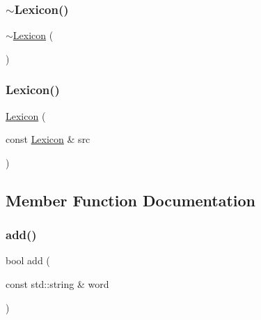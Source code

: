 \mbox{\label{classLexicon_a9d71fdc56ec42614e240463e6724969e}} 
\subsubsection{\texorpdfstring{$\sim$\+Lexicon()}{~Lexicon()}}
{\footnotesize\ttfamily $\sim$\mbox{\hyperlink{classLexicon}{Lexicon}} (\begin{DoxyParamCaption}{ }\end{DoxyParamCaption})\hspace{0.3cm}{\ttfamily [virtual]}}

\mbox{\label{classLexicon_acd310b995d41180f2f29bd68bec7d290}} 
\subsubsection{\texorpdfstring{Lexicon()}{Lexicon()}\hspace{0.1cm}{\footnotesize\ttfamily [5/5]}}
{\footnotesize\ttfamily \mbox{\hyperlink{classLexicon}{Lexicon}} (\begin{DoxyParamCaption}\item[{const \mbox{\hyperlink{classLexicon}{Lexicon}} \&}]{src }\end{DoxyParamCaption})}



\subsection{Member Function Documentation}
\mbox{\label{classLexicon_ae678e727fb107637268e8f00cd759889}} 
\subsubsection{\texorpdfstring{add()}{add()}}
{\footnotesize\ttfamily bool add (\begin{DoxyParamCaption}\item[{const std\+::string \&}]{word }\end{DoxyParamCaption})}

\mbox{\label{classLexicon_a9d62d8dcb351ae40c8a2220a9871348b}} 
